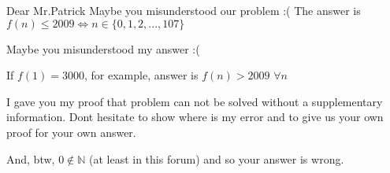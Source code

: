 \begin{solution}
	\begin{tcolorbox}Dear Mr.Patrick 
Maybe you misunderstood our problem :( 
The answer is $\boxed{ f(n)\le 2009 \iff n\in \{0,1,2,...,107\}}$\end{tcolorbox}

Maybe you misunderstood my answer :(

If $f(1)=3000$, for example, answer is $f(n)>2009$  $\forall n$

I gave you my proof that problem can not be solved without a supplementary information.
Dont hesitate to show where is my error and to give us your own proof for your own answer.

And, btw, $0\notin\mathbb N$ (at least in this forum) and so your answer is wrong.
\end{solution}



